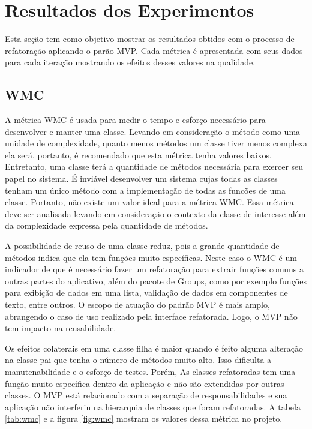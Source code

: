 \section{Resultados dos Experimentos}

Esta seção tem como objetivo mostrar os resultados obtidos com o processo de
refatoração aplicando o parão MVP. Cada métrica é apresentada com seus dados
para cada iteração mostrando os efeitos desses valores na qualidade.

\subsection{WMC}

A métrica WMC é usada para medir o tempo e esforço necessário para desenvolver e
manter uma classe. Levando em consideração o método como uma unidade de
complexidade, quanto menos métodos um classe tiver menos complexa ela será,
portanto, é recomendado que esta métrica tenha valores baixos.
Entretanto, uma classe terá a quantidade de métodos necessária para exercer seu
papel no sistema. É inviável desenvolver um sistema cujas todas as classes
tenham um único método com a implementação de todas as funcões de uma
classe. Portanto, não existe um valor ideal para a métrica WMC. Essa métrica
deve ser analisada levando em consideração o contexto da classe de interesse além da
complexidade expressa pela quantidade de métodos. 

A possibilidade de reuso de uma classe reduz, pois a grande quantidade de
métodos indica que ela tem funções muito específicas\cite{cksuite}. Neste caso o
WMC é um indicador de que é necessário fazer um refatoração para extrair funções comuns a outras partes do
aplicativo, além do pacote de Groups, como por exemplo funções para exibição de
dados em uma lista, validação de dados em componentes de texto, entre outros. O
escopo de atuação do padrão MVP é mais amplo, abrangendo o caso de uso realizado pela
interface refatorada. Logo, o MVP não tem impacto na reusabilidade.

Os efeitos colaterais em uma classe filha é maior quando é feito alguma
alteração na classe pai que tenha o número de métodos muito alto\cite{cksuite}.
Isso dificulta a manutenabilidade e o esforço de testes. Porém, As classes
refatoradas tem uma função muito específica dentro da aplicação e não são
extendidas por outras classes. O MVP está relacionado com a separação de
responsabilidades e sua aplicação não interferiu na hierarquia de classes que
foram refatoradas.
A tabela \ref{tab:wmc} e a figura \ref{fig:wmc} mostram os valores dessa
métrica no projeto.


